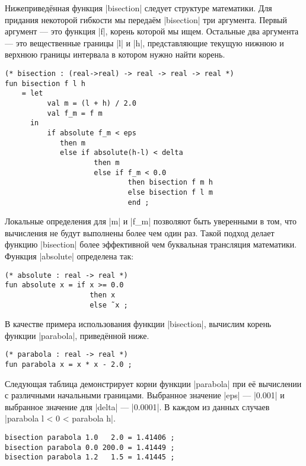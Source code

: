 Нижеприведённая функция \inline|bisection| следует структуре математики. Для придания некоторой гибкости мы передаём \inline|bisection| три аргумента. Первый аргумент --- это функция \inline|f|, корень которой мы ищем. Остальные два аргумента --- это вещественные границы \inline|l| и \inline|h|, представляющие текущую нижнюю и верхнюю границы интервала в котором нужно найти корень.

\begin{lstlisting}[style=customml]
(* bisection : (real->real) -> real -> real -> real *)
fun bisection f l h
    = let
          val m = (l + h) / 2.0
          val f_m = f m
      in
          if absolute f_m < eps
             then m
             else if absolute(h-l) < delta
                     then m
                     else if f_m < 0.0
                             then bisection f m h
                             else bisection f l m
                             end ;
\end{lstlisting}

Локальные определения для \inline|m| и \inline|f_m| позволяют быть уверенными в том, что вычисления не будут выполнены более чем один раз. Такой подход делает функцию \inline|bisection| более эффективной чем буквальная трансляция математики. Функция \inline|absolute| определена так:

\begin{lstlisting}[style=customml]
(* absolute : real -> real *)
fun absolute x = if x >= 0.0
                    then x
                    else ˜x ;
\end{lstlisting}

В качестве примера использования функции \inline|bisection|, вычислим корень функции \inline|parabola|, приведённой ниже.

\begin{lstlisting}[style=customml]
(* parabola : real -> real *)
fun parabola x = x * x - 2.0 ;
\end{lstlisting}

Следующая таблица демонстрирует корни функции \inline|parabola| при её вычислении с различными начальными границами. Выбранное значение \inline|eps| --- \inline|0.001| и выбранное значение для \inline|delta| --- \inline|0.0001|. В каждом из данных случаев \inline|parabola l < 0 < parabola h|.

\begin{lstlisting}[style=customml]
bisection parabola 1.0   2.0 = 1.41406 ;
bisection parabola 0.0 200.0 = 1.41449 ;
bisection parabola 1.2   1.5 = 1.41445 ;
\end{lstlisting}

